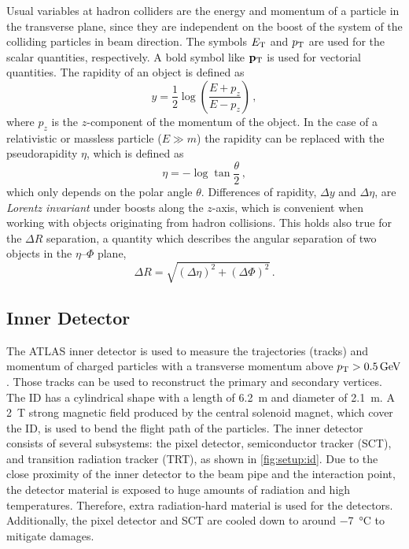Usual variables at hadron colliders are the energy and momentum of a particle in the transverse plane, since
they are independent on the boost of the system of the colliding particles in beam direction.
The symbols $E_\text{T}$ and $p_\text{T}$ are used for the scalar quantities, respectively.
A bold symbol like $\mathbf{p}_\text{T}$ is used for vectorial quantities.
The rapidity of an object is defined as
\begin{equation}
    \label{eq:rapidity}
    y = \frac{1}{2} \log \left( \frac{E + p_z}{E - p_z}\right) \,,
\end{equation}
where $p_z$ is the $z$-component of the momentum of the object.
In the case of a relativistic or massless particle ($E \gg m$) the rapidity can be replaced with the pseudorapidity $\eta$,
which is defined as
\begin{equation}
    \label{eq:pseudorapidity}
    \eta = - \log \tan \frac{\theta}{2} \,,
\end{equation}
which only depends on the polar angle $\theta$.
Differences of rapidity, $\Delta y$ and $\Delta \eta$, are \emph{Lorentz invariant} under boosts along the $z$-axis,
which is convenient when working with objects originating from hadron collisions.
This holds also true for the $\Delta R$ separation, a quantity which describes the angular separation of two objects
in the $\eta$\nobreakdash--$\Phi$ plane,
\begin{equation}
    \label{eq:deltar}
    \Delta R = \sqrt{{\left(\Delta\eta\right)}^2 + {\left(\Delta \Phi\right)}^2} \,.
\end{equation}

\subsection{Inner Detector}\label{sub:setup:id}

The ATLAS inner detector is used to measure the trajectories (tracks) and momentum of charged particles with
a transverse momentum above $\pt > \SI{0.5}{\GeV}$.
Those tracks can be used to reconstruct the primary and secondary vertices.
The ID has a cylindrical shape with a length of \SI{6.2}{\m} and diameter of \SI{2.1}{\m}.
A \SI{2}{\tesla} strong magnetic field produced by the central solenoid magnet, which cover the ID, is used to bend the flight path of the particles.
The inner detector consists of several subsystems: the pixel detector, semiconductor tracker (SCT), and transition
radiation tracker (TRT), as shown in \cref{fig:setup:id}.
Due to the close proximity of the inner detector to the beam pipe and the interaction point, the detector material
is exposed to huge amounts of radiation and high temperatures.
Therefore, extra radiation-hard material is used for the detectors.
Additionally, the pixel detector and SCT are cooled down to around \SI{-7}{\degreeCelsius} to mitigate damages.

